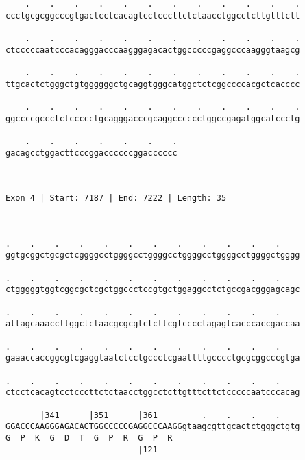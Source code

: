 \documentclass{article}
\begin{document}
\begin{Verbatim}
    .    .    .    .    .    .    .    .    .    .    .    .
ccctgcgcggcccgtgactcctcacagtcctcccttctctaacctggcctcttgtttctt
                                                            
    .    .    .    .    .    .    .    .    .    .    .    .
ctcccccaatcccacagggacccaagggagacactggcccccgaggcccaagggtaagcg
                                                            
    .    .    .    .    .    .    .    .    .    .    .    .
ttgcactctgggctgtggggggctgcaggtgggcatggctctcggccccacgctcacccc
                                                            
    .    .    .    .    .    .    .    .    .    .    .    .
ggccccgccctctccccctgcagggacccgcaggcccccctggccgagatggcatccctg
                                                            
    .    .    .    .    .    .    .
gacagcctggacttcccggaccccccggacccccc
                                   
                                   
 
Exon 4 | Start: 7187 | End: 7222 | Length: 35



.    .    .    .    .    .    .    .    .    .    .    .    
ggtgcggctgcgctcggggcctggggcctggggcctggggcctggggcctggggctgggg
                                                            
.    .    .    .    .    .    .    .    .    .    .    .    
ctgggggtggtcggcgctcgctggccctccgtgctggaggcctctgccgacgggagcagc
                                                            
.    .    .    .    .    .    .    .    .    .    .    .    
attagcaaaccttggctctaacgcgcgtctcttcgtcccctagagtcacccaccgaccaa
                                                            
.    .    .    .    .    .    .    .    .    .    .    .    
gaaaccaccggcgtcgaggtaatctcctgccctcgaattttgcccctgcgcggcccgtga
                                                            
.    .    .    .    .    .    .    .    .    .    .    .    
ctcctcacagtcctcccttctctaacctggcctcttgtttcttctcccccaatcccacag
                                                            
       |341      |351      |361         .    .    .    .    
GGACCCAAGGGAGACACTGGCCCCCGAGGCCCAAGGgtaagcgttgcactctgggctgtg
G  P  K  G  D  T  G  P  R  G  P  R                          
                           |121                             
  

\end{Verbatim}
\end{document}
